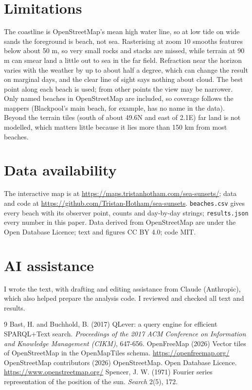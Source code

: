 \documentclass[11pt,a4paper]{article}
\begin{document}
\section{Limitations}
The coastline is OpenStreetMap's mean high water line, so at low tide on wide sands the foreground is beach, not sea. Rasterising at zoom 10 smooths features below about 50 m, so very small rocks and stacks are missed, while terrain at 90 m can smear land a little out to sea in the far field. Refraction near the horizon varies with the weather by up to about half a degree, which can change the result on marginal days, and the clear line of sight says nothing about cloud. The best point along each beach is used; from other points the view may be narrower. Only named beaches in OpenStreetMap are included, so coverage follows the mappers (Blackpool's main beach, for example, has no name in the data). Beyond the terrain tiles (south of about 49.6\textdegree N and east of 2.1\textdegree E) far land is not modelled, which matters little because it lies more than 150 km from most beaches.

\section{Data availability}
The interactive map is at \url{https://maps.tristanhotham.com/sea-sunsets/}; data and code at \url{https://github.com/Tristan-Hotham/sea-sunsets}. \texttt{beaches.csv} gives every beach with its observer point, counts and day-by-day strings; \texttt{results.json} every number in this paper. Data derived from OpenStreetMap are under the Open Database Licence; text and figures CC BY 4.0; code MIT.

\section*{AI assistance}
I wrote the text, with drafting and editing assistance from Claude (Anthropic), which also helped prepare the analysis code. I reviewed and checked all text and results.

\begin{thebibliography}{9}
 Bast, H. and Buchhold, B. (2017) QLever: a query engine for efficient SPARQL+Text search. \textit{Proceedings of the 2017 ACM Conference on Information and Knowledge Management (CIKM)}, 647-656.
 OpenFreeMap (2026) Vector tiles of OpenStreetMap in the OpenMapTiles schema. \url{https://openfreemap.org/}
 OpenStreetMap contributors (2026) OpenStreetMap. Open Database Licence. \url{https://www.openstreetmap.org/}
 Spencer, J. W. (1971) Fourier series representation of the position of the sun. \textit{Search} 2(5), 172.
\end{thebibliography}
\end{document}
